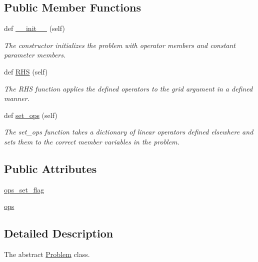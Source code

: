 \subsection*{Public Member Functions}
\begin{DoxyCompactItemize}
\item 
def \hyperlink{classMain__PDE__Repo_1_1src_1_1problem_1_1Problem_a3bd7ab602ec2348c69edcfc82fc35794}{\+\_\+\+\_\+init\+\_\+\+\_\+} (self)
\begin{DoxyCompactList}\small\item\em The constructor initializes the problem with operator members and constant parameter members. \end{DoxyCompactList}\item 
def \hyperlink{classMain__PDE__Repo_1_1src_1_1problem_1_1Problem_a1885fe3e15581db4feda8af513ae91e5}{R\+HS} (self)
\begin{DoxyCompactList}\small\item\em The R\+HS function applies the defined operators to the grid argument in a defined manner. \end{DoxyCompactList}\item 
def \hyperlink{classMain__PDE__Repo_1_1src_1_1problem_1_1Problem_aeaea1beb92b43dde42d5175ddde1f276}{set\+\_\+ops} (self)
\begin{DoxyCompactList}\small\item\em The set\+\_\+ops function takes a dictionary of linear operators defined elsewhere and sets them to the correct member variables in the problem. \end{DoxyCompactList}\end{DoxyCompactItemize}
\subsection*{Public Attributes}
\begin{DoxyCompactItemize}
\item 
\hyperlink{classMain__PDE__Repo_1_1src_1_1problem_1_1Problem_a7700a3b18e39488fbe81a8fb06ebb982}{ops\+\_\+set\+\_\+flag}
\item 
\hyperlink{classMain__PDE__Repo_1_1src_1_1problem_1_1Problem_a7736044b7f2938008a30043000e62f87}{ops}
\end{DoxyCompactItemize}


\subsection{Detailed Description}
The abstract \hyperlink{classMain__PDE__Repo_1_1src_1_1problem_1_1Problem}{Problem} class. 


